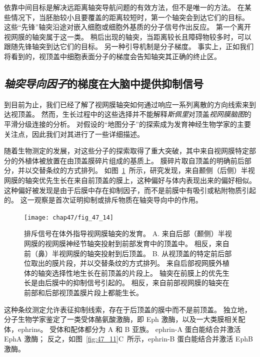 依靠中间目标是解决远距离轴突导航问题的有效方法，但不是唯一的方法。
在某些情况下，当胚胎较小且要覆盖的距离较短时，第一个轴突会到达它们的目标。
这些“先锋”轴突沿途对嵌入细胞或细胞外基质的分子信号作出反应。
第一个离开视网膜的轴突属于这一类。
稍后出现的轴突，当距离较长且障碍物较多时，可以跟随先锋轴突到达它们的目标。
另一种引导机制是分子梯度。
事实上，正如我们将看到的，视顶盖中细胞表面分子的梯度会告知轴突其正确的终止区。



\subsection{\textit{轴突导向因子}的梯度在大脑中提供抑制信号}

到目前为止，我们已经了解了视网膜轴突如何通过响应一系列离散的方向线索来到达视顶盖。
然而，生长过程中的这些选择并不能解释\textit{斯佩里}对顶盖\textit{视网膜脑图}的平滑分级连接的分析。
对假设的“地图分子”的探索成为发育神经生物学家的主要关注点，因此我们对其进行了一些详细描述。


随着生物测定的发展，对这些分子的探索取得了重大突破，其中来自视网膜特定部分的外植体被放置在由顶盖膜碎片组成的基质上。
膜碎片取自顶盖的明确前后部分，并以交替条纹的方式排列。 
如图~\ref{fig:47_14}~所示，研究发现，来自颞侧（后侧）半视网膜的轴突优先生长在来自前顶盖的膜上，这种偏好与体内表现出来的偏好相似。
这种偏好被发现是由于后膜中存在抑制因子，而不是前膜中有吸引或粘附物质引起的。
这一观察是首次证明抑制或排斥物质在轴突导向中的作用。


\begin{figure}[htbp]
	\centering
	\texttt{[image: chap47/fig\_47\_14]}
	\caption{排斥信号在体外指导视网膜轴突的发育。
		A. 来自后部（颞侧）半视网膜的视网膜神经节轴突投射到前部发育中的顶盖中。
		相反，来自前（鼻）半视网膜的轴突投射到后顶盖。
		B. 从视顶盖的特定前后部位取出的膜片段，并以交替条纹的方式排列。
		来自后部视网膜外植体的轴突选择性地生长在前顶盖的片段上。
		轴突在前膜上的优先生长是由后膜中的抑制信号引起的。
		相反，来自前部视网膜的轴突在前部和后部视顶盖膜片段上都能生长\cite{walter1987avoidance}。}
	\label{fig:47_14}
\end{figure}


这种条纹测定允许表征抑制线索，存在于后顶盖的膜中而不是前顶盖。
独立地，分子生物学家鉴定了一类受体酪氨酸激酶，即 Eph 激酶，以及一大类膜相关配体，ephrins。
受体和配体都分为 A 和 B 亚族。
ephrin-A 蛋白能结合并激活 EphA 激酶；
反之，如图~\ref{fig:47_11}C~所示，ephrin-B 蛋白能结合并激活 EphB 激酶。


